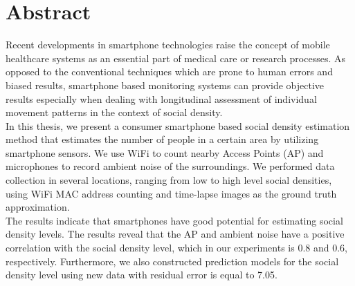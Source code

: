 \begingroup
\let\clearpage\relax
\let\cleardoublepage\relax
\let\cleardoublepage\relax

\chapter*{Abstract}
Recent developments in smartphone technologies raise the concept of mobile healthcare systems as an essential part of medical care or research processes. As opposed to the conventional techniques which are prone to human errors and biased results, smartphone based monitoring systems can provide objective results especially when dealing with longitudinal assessment of individual movement patterns in the context of social density.\\

\noindent
In this thesis, we present a consumer smartphone based social density estimation method that estimates the number of people in a certain area by utilizing smartphone sensors. We use WiFi to count nearby Access Points (AP) and microphones to record ambient noise of the surroundings. We performed data collection in several locations, ranging from low to high level social densities, using WiFi MAC address counting and time-lapse images as the ground truth approximation.\\

\noindent
The results indicate that smartphones have good potential for estimating social density levels. The results reveal that the AP and ambient noise have a positive correlation with the social density level, which in our experiments is 0.8 and 0.6, respectively. Furthermore, we also constructed prediction models for the social density level using new data with residual error is equal to 7.05.

\endgroup			

\vfill